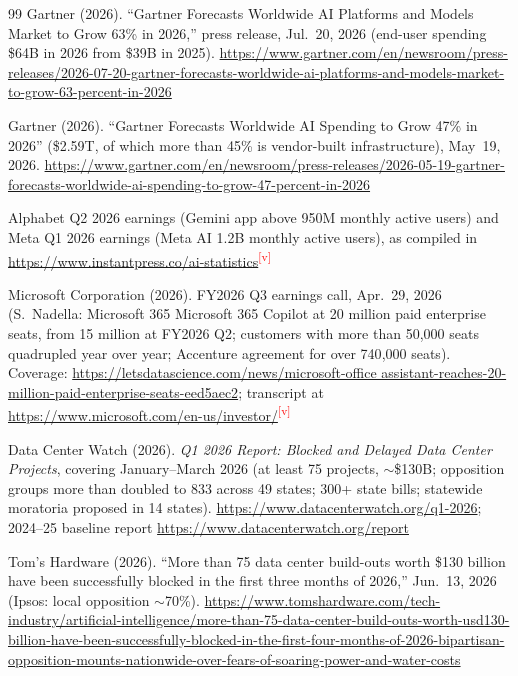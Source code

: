 \documentclass[11pt,letterpaper]{article}
\newcommand{\verify}{\textsuperscript{\textcolor{red}{[v]}}}
\begin{document}
\begin{thebibliography}{99}
Gartner (2026). ``Gartner Forecasts Worldwide AI Platforms and Models Market to Grow 63\% in 2026,'' press release, Jul.~20, 2026 (end-user spending \$64B in 2026 from \$39B in 2025). \url{https://www.gartner.com/en/newsroom/press-releases/2026-07-20-gartner-forecasts-worldwide-ai-platforms-and-models-market-to-grow-63-percent-in-2026}

Gartner (2026). ``Gartner Forecasts Worldwide AI Spending to Grow 47\% in 2026'' (\$2.59T, of which more than 45\% is vendor-built infrastructure), May~19, 2026. \url{https://www.gartner.com/en/newsroom/press-releases/2026-05-19-gartner-forecasts-worldwide-ai-spending-to-grow-47-percent-in-2026}

Alphabet Q2 2026 earnings (Gemini app above 950M monthly active users) and Meta Q1 2026 earnings (Meta AI 1.2B monthly active users), as compiled in \url{https://www.instantpress.co/ai-statistics}\verify

Microsoft Corporation (2026). FY2026 Q3 earnings call, Apr.~29, 2026 (S.~Nadella: Microsoft 365 Microsoft 365 Copilot at 20 million paid enterprise seats, from 15 million at FY2026 Q2; customers with more than 50{,}000 seats quadrupled year over year; Accenture agreement for over 740{,}000 seats). Coverage: \url{https://letsdatascience.com/news/microsoft-office assistant-reaches-20-million-paid-enterprise-seats-eed5aec2}; transcript at \url{https://www.microsoft.com/en-us/investor/}\verify

Data Center Watch (2026). \textit{Q1 2026 Report: Blocked and Delayed Data Center Projects}, covering January--March 2026 (at least 75 projects, $\sim$\$130B; opposition groups more than doubled to 833 across 49 states; 300+ state bills; statewide moratoria proposed in 14 states). \url{https://www.datacenterwatch.org/q1-2026}; 2024--25 baseline report \url{https://www.datacenterwatch.org/report}

Tom's Hardware (2026). ``More than 75 data center build-outs worth \$130 billion have been successfully blocked in the first three months of 2026,'' Jun.~13, 2026 (Ipsos: local opposition $\sim$70\%). \url{https://www.tomshardware.com/tech-industry/artificial-intelligence/more-than-75-data-center-build-outs-worth-usd130-billion-have-been-successfully-blocked-in-the-first-four-months-of-2026-bipartisan-opposition-mounts-nationwide-over-fears-of-soaring-power-and-water-costs}


\end{thebibliography}
\end{document}
